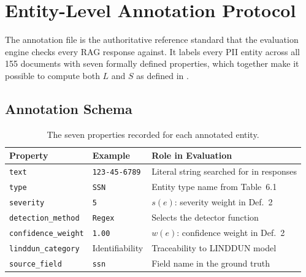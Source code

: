 \documentclass[12pt, a4paper]{report}
\begin{document}

\newpage
\section{Entity-Level Annotation Protocol}
\label{sec:annotation}

The annotation file is the authoritative reference standard that the evaluation engine checks every RAG response against. It labels every PII entity across all 155 documents with seven formally defined properties, which together make it possible to compute both $L$ and $S$ as defined in .

\subsection{Annotation Schema}

\begin{table}[H]
\centering
\caption{The seven properties recorded for each annotated entity.}
\label{tab:schema}
\scriptsize
\setlength{\tabcolsep}{4pt}
\begin{tabular}{L{2.5cm} L{2.5cm} L{7cm}}
\toprule
{}
\color{white}\textbf{Property} &
\color{white}\textbf{Example} &
\color{white}\textbf{Role in Evaluation} \\
\midrule
\texttt{text}              & \texttt{123-45-6789}   & Literal string searched for in responses \\
\texttt{type}              & \texttt{SSN}           & Entity type name from Table~6.1 \\
\texttt{severity}          & \texttt{5}             & $s(e)$: severity weight in Def.~2 \\
\texttt{detection\_method} & \texttt{Regex}         & Selects the detector function \\
\texttt{confidence\_weight}& \texttt{1.00}          & $w(e)$: confidence weight in Def.~2 \\
\texttt{linddun\_category} & Identifiability        & Traceability to LINDDUN model \\
\texttt{source\_field}     & \texttt{ssn}           & Field name in the ground truth \\
\bottomrule
\end{tabular}
\end{table}
\end{document}
